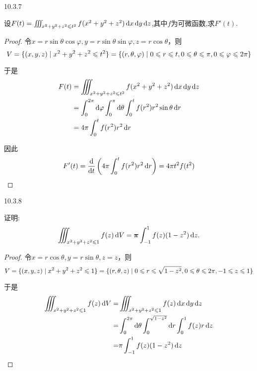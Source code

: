 \begin{exercise}
    {10.3.7}

    设$F(t) = \iiint_{x^2 + y^2 + z^2 \leqslant t^2 } f(x^2 + y^2 + z^2) \operatorname{d\!} x \operatorname{d\!} y \operatorname{d\!} z$,其中$f$为可微函数,求$F'(t)$.
\end{exercise}

\begin{proof}
    令$x=r \sin\theta \cos\varphi, y = r \sin\theta \sin\varphi, z = r \cos\theta$，则
    $$ V = \{ (x,y,z) \mid x^2 + y^2 + z^2 \leqslant t^2 \} = \{ (r, \theta, \varphi) \mid 0 \leqslant r \leqslant t, 0 \leqslant \theta \leqslant \pi, 0 \leqslant \varphi \leqslant 2\pi \} $$

于是
\begin{align*}
F(t) 
&= \iiint_{x^2 + y^2 + z^2 \leqslant t^2} f(x^2 + y^2 + z^2) \operatorname{d\!} x \operatorname{d\!} y \operatorname{d\!} z \\
&= \int_0^{2\pi} \operatorname{d\!}\varphi \int_0^{\pi} \operatorname{d\!}\theta \int_0^t f(r^2) r^2 \sin\theta \operatorname{d\!} r \\
&= 4\pi \int_0^t f(r^2) r^2 \operatorname{d\!} r
\end{align*}

因此
\[
F'(t) = \dv{t} \left( 4\pi \int_0^t f(r^2) r^2 \operatorname{d\!} r \right) 
= 4\pi t^2 f(t^2)
\]
\end{proof}


\begin{exercise}
    {10.3.8} 

    证明:
    $$
    \iiint_{x^2+y^2+z^2 \leqslant 1} f(z) \operatorname{d\!} V = \bm \pi \int_{-1}^1 f(z) (1-z^2) \operatorname{d\!} z.
    $$
\end{exercise}

\begin{proof}
    令$x = r \cos \theta, y = r \sin \theta, z = z$，则
    $$ V = \{ (x,y,z) \mid x^2 + y^2 + z^2 \leqslant 1 \} = \{ (r, \theta, z) \mid 0 \leqslant r \leqslant \sqrt{1 - z^2}, 0 \leqslant \theta \leqslant 2\pi, -1 \leqslant z \leqslant 1\} $$

    于是
    \begin{align*}
    \iiint_{x^2+y^2+z^2 \les 1} f(z) \dif V =& \iiint_{x^2+y^2+z^2 \les 1} f(z) \dif x \dif y \dif z \\
    =& \int_0^{2\pi} \dif \theta \int_0^{\sqrt{1-z^2}} \dif r \int_0^1 f(z) r \dif z \\
    =& \pi \int_{-1}^1 f(z) (1 - z^2) \dif z
    \end{align*}
\end{proof}





